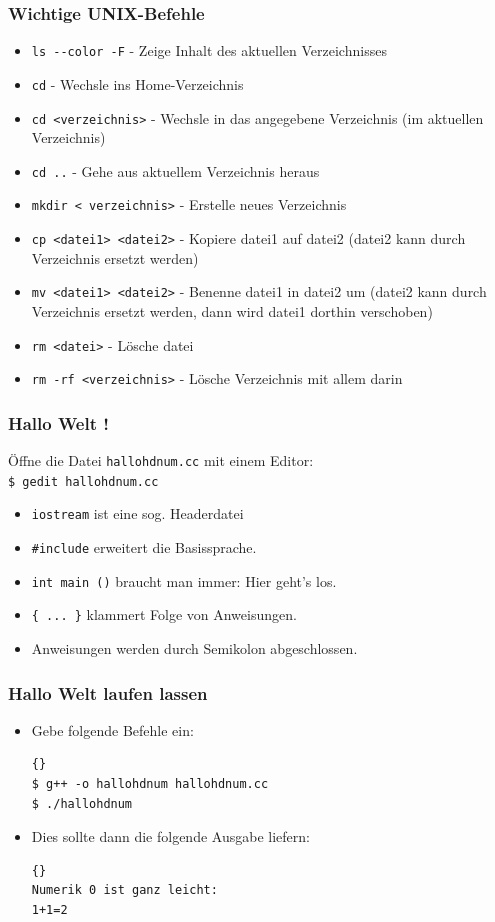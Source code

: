 \begin{frame}
\frametitle{Wichtige UNIX-Befehle}
\begin{itemize}
\item \lstinline{ls --color -F} - Zeige Inhalt des aktuellen Verzeichnisses
\item \lstinline{cd} - Wechsle ins Home-Verzeichnis
\item \lstinline{cd <verzeichnis>} - Wechsle in das angegebene
  Verzeichnis (im aktuellen Verzeichnis)
\item \lstinline{cd ..} - Gehe aus aktuellem Verzeichnis heraus
\item \lstinline{mkdir < verzeichnis>} - Erstelle neues Verzeichnis
\item \lstinline{cp <datei1> <datei2>} - Kopiere datei1 auf datei2
  (datei2 kann durch Verzeichnis ersetzt werden)
\item \lstinline{mv <datei1> <datei2>} - Benenne datei1 in datei2 um
  (datei2 kann durch Verzeichnis ersetzt werden, dann wird datei1
  dorthin verschoben)
\item \lstinline{rm <datei>} - Lösche datei
\item \lstinline{rm -rf <verzeichnis>} - Lösche Verzeichnis mit allem darin
\end{itemize}
\end{frame}

\begin{frame}[fragile]
\frametitle{Hallo Welt !}
Öffne die Datei \lstinline{hallohdnum.cc} mit einem Editor:
\\ \lstinline{$ gedit hallohdnum.cc} %

\begin{itemize}
\item \lstinline{iostream} ist eine sog. \glqq{}Headerdatei\grqq{}
\item \lstinline!#include! erweitert die \glqq{}Basissprache\grqq{}.
\item \lstinline!int main ()! braucht man immer: \glqq{}Hier geht's los\grqq{}.
\item \lstinline!{ ... }! klammert Folge von Anweisungen.
\item Anweisungen werden durch Semikolon abgeschlossen.
\end{itemize}
\end{frame}

\begin{frame}[fragile]
\frametitle{Hallo Welt laufen lassen}
\begin{itemize}
\item Gebe folgende Befehle ein:
{\small\begin{lstlisting}{}
$ g++ -o hallohdnum hallohdnum.cc
$ ./hallohdnum
\end{lstlisting}}
\item Dies sollte dann die folgende Ausgabe liefern:
{\small\begin{lstlisting}{}
Numerik 0 ist ganz leicht:
1+1=2
\end{lstlisting}}
\end{itemize}
\end{frame}

